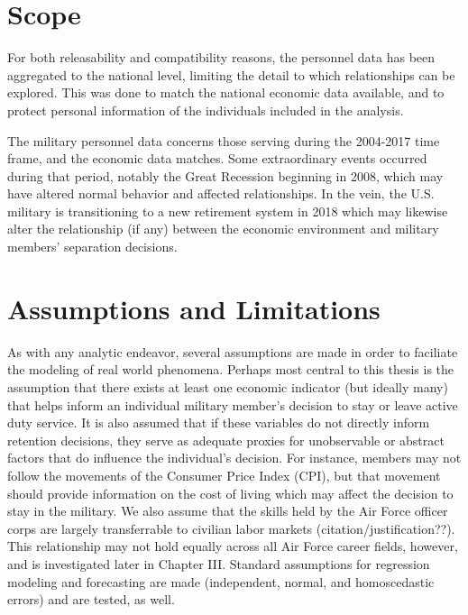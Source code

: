 \documentclass[12pt,letterpaper,toc=flat,oneside]{report}
\theoremstyle{definition}
\theoremstyle{definition}
\theoremstyle{definition}
\theoremstyle{remark}
\begin{document}
\hypertarget{scope}{%
\section{Scope}\label{scope}}

For both releasability and compatibility reasons, the personnel data has
been aggregated to the national level, limiting the detail to which
relationships can be explored. This was done to match the national
economic data available, and to protect personal information of the
individuals included in the analysis.

The military personnel data concerns those serving during the 2004-2017
time frame, and the economic data matches. Some extraordinary events
occurred during that period, notably the Great Recession beginning in
2008, which may have altered normal behavior and affected relationships.
In the vein, the U.S. military is transitioning to a new retirement
system in 2018 which may likewise alter the relationship (if any)
between the economic environment and military members' separation
decisions.

\hypertarget{assumptions-and-limitations}{%
\section{Assumptions and
Limitations}\label{assumptions-and-limitations}}

As with any analytic endeavor, several assumptions are made in order to
faciliate the modeling of real world phenomena. Perhaps most central to
this thesis is the assumption that there exists at least one economic
indicator (but ideally many) that helps inform an individual military
member's decision to stay or leave active duty service. It is also
assumed that if these variables do not directly inform retention
decisions, they serve as adequate proxies for unobservable or abstract
factors that do influence the individual's decision. For instance,
members may not follow the movements of the Consumer Price Index (CPI),
but that movement should provide information on the cost of living which
may affect the decision to stay in the military. We also assume that the
skills held by the Air Force officer corps are largely transferrable to
civilian labor markets (citation/justification??). This relationship may
not hold equally across all Air Force career fields, however, and is
investigated later in Chapter III. Standard assumptions for regression
modeling and forecasting are made (independent, normal, and
homoscedastic errors) and are tested, as well.
\end{document}
